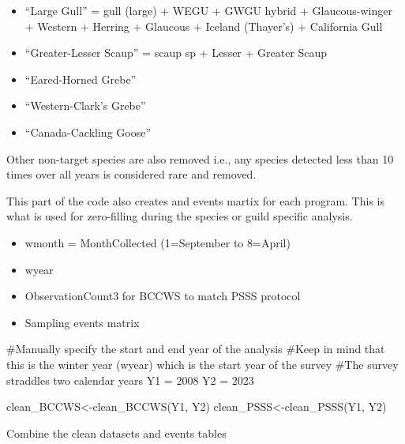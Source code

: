 \documentclass[
  letterpaper,
  DIV=11,
  numbers=noendperiod]{scrreprt}
\newenvironment{Shaded}{\begin{snugshade}}{\end{snugshade}}
\newcommand{\CommentTok}[1]{\textcolor[rgb]{0.37,0.37,0.37}{#1}}
\newcommand{\DecValTok}[1]{\textcolor[rgb]{0.68,0.00,0.00}{#1}}
\newcommand{\FunctionTok}[1]{\textcolor[rgb]{0.28,0.35,0.67}{#1}}
\newcommand{\NormalTok}[1]{\textcolor[rgb]{0.00,0.23,0.31}{#1}}
\newcommand{\OtherTok}[1]{\textcolor[rgb]{0.00,0.23,0.31}{#1}}
\providecommand{\tightlist}{%
  \setlength{\itemsep}{0pt}\setlength{\parskip}{0pt}}\usepackage{longtable,booktabs,array}
\begin{document}
\begin{itemize}
\item
  ``Large Gull'' = gull (large) + WEGU + GWGU hybrid + Glaucous-winger +
  Western + Herring + Glaucous + Iceland (Thayer's) + California Gull
\item
  ``Greater-Lesser Scaup'' = scaup sp + Lesser + Greater Scaup
\item
  ``Eared-Horned Grebe''
\item
  ``Western-Clark's Grebe''
\item
  ``Canada-Cackling Goose''
\end{itemize}

Other non-target species are also removed i.e., any species detected
less than 10 times over all years is considered rare and removed.

This part of the code also creates and events martix for each program.
This is what is used for zero-filling during the species or guild
specific analysis.

\begin{itemize}
\tightlist
\item
  wmonth = MonthCollected (1=September to 8=April)
\item
  wyear
\item
  ObservationCount3 for BCCWS to match PSSS protocol
\item
  Sampling events matrix
\end{itemize}

\begin{Shaded}
\begin{Highlighting}[]
\CommentTok{\#Manually specify the start and end year of the analysis}
\CommentTok{\#Keep in mind that this is the winter year (wyear) which is the start year of the survey}
\CommentTok{\#The survey straddles two calendar years}
\NormalTok{Y1 }\OtherTok{=} \DecValTok{2008}
\NormalTok{Y2 }\OtherTok{=} \DecValTok{2023}

\NormalTok{clean\_BCCWS}\OtherTok{\textless{}{-}}\FunctionTok{clean\_BCCWS}\NormalTok{(Y1, Y2)}
\NormalTok{clean\_PSSS}\OtherTok{\textless{}{-}}\FunctionTok{clean\_PSSS}\NormalTok{(Y1, Y2)}
\end{Highlighting}
\end{Shaded}

Combine the clean datasets and events tables
\end{document}
